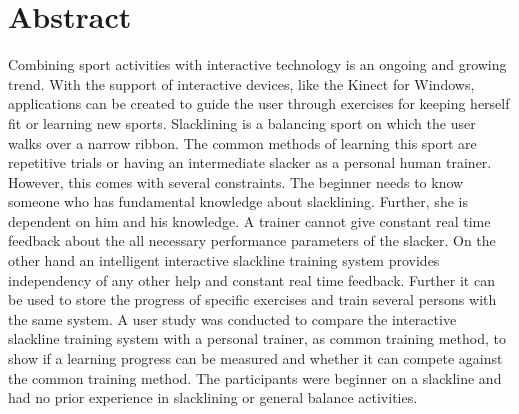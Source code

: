 \section*{Abstract}
\begin{comment}
- Einleitung
- Problem/Ziele
- Vorgesteller lösungsansatz
-- Exergame
-- SLS
-- Real time feedback
- einbau methodischer reihe als lernmethodik
- vergleich zu üblichen personal trainer
- Messung
- Results
- Conclusion


- trend von interaktiven lernmethodiken in allen bereichen des sports
- nichts vergeichbares in slacklinen
- Führen des nutzers mithilfe einer bestimmten lernmethodik und routine
- studie
\end{comment}
Combining sport activities with interactive technology is an ongoing and growing trend.
With the support of interactive devices, like the Kinect for Windows, applications can be created to guide the user through exercises for keeping herself fit or learning new sports.
Slacklining is a balancing sport on which the user walks over a narrow ribbon.
The common methods of learning this sport are repetitive trials or having an intermediate slacker as a personal human trainer.
However, this comes with several constraints. 
The beginner needs to know someone who has fundamental knowledge about slacklining.
Further, she is dependent on him and his knowledge.
A trainer cannot give constant real time feedback about the all necessary performance parameters of the slacker.
On the other hand an intelligent interactive slackline training system provides independency of any other help and constant real time feedback.
Further it can be used to store the progress of specific exercises and train several persons with the same system.
A user study was conducted to compare the interactive slackline training system  with a personal trainer, as common training method, to show if a learning progress can be measured and whether it can compete against the common training method.
The participants were beginner on a slackline and had no prior experience in slacklining or general balance activities.





